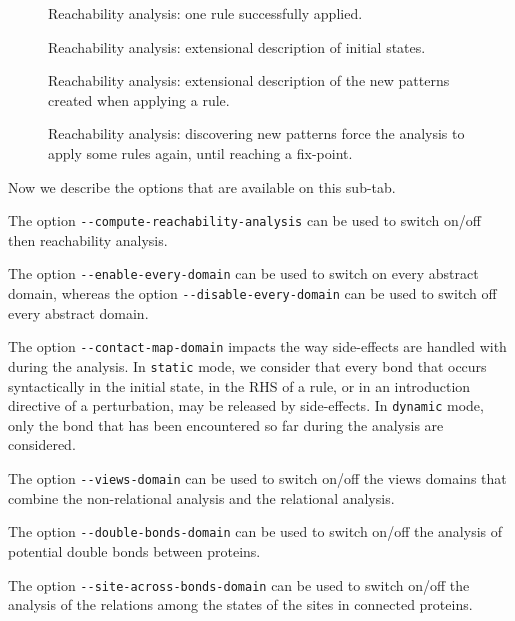 \documentclass[11pt]{book}
\begin{document}
\begin{figure}[htbp]

\caption{Reachability analysis: one rule successfully applied.}
\label{fig:reachability_medium_ok}
\end{figure}

\begin{figure}[htbp]

\caption{Reachability analysis: extensional description of initial states.}
\label{fig:reachability_high_init}
\end{figure}

\begin{figure}[htbp]

\caption{Reachability analysis: extensional description of the new patterns  created when applying a rule.}
\label{fig:reachability_high_rule}
\end{figure}

\begin{figure}[htbp]

\caption{Reachability analysis: discovering new patterns force the analysis to apply some rules again, until reaching a fix-point.}
\label{fig:reachability_full}
\end{figure}

Now we describe the options that are available on this sub-tab.

The option \verb?--compute-reachability-analysis? can be used to switch on/off then reachability analysis.

The option \verb?--enable-every-domain? can be used to switch on every abstract domain, whereas the option \verb?--disable-every-domain? can be used to switch off every abstract domain.

The option \verb?--contact-map-domain? impacts the way side-effects are handled with during the analysis. In \verb?static? mode, we consider that every bond that occurs syntactically in the initial state, in the RHS of a rule, or in an introduction directive of a perturbation, may be released by side-effects.
In \verb?dynamic? mode, only the bond that has been encountered so far during the analysis are considered.

The option \verb?--views-domain? can be used to switch on/off the views domains that combine the non-relational analysis and the relational analysis.

The option \verb?--double-bonds-domain? can be used to switch on/off the analysis of potential double bonds between proteins.

The option \verb?--site-across-bonds-domain? can be used to switch on/off the analysis of the relations among the states of the sites in connected proteins.
\end{document}
